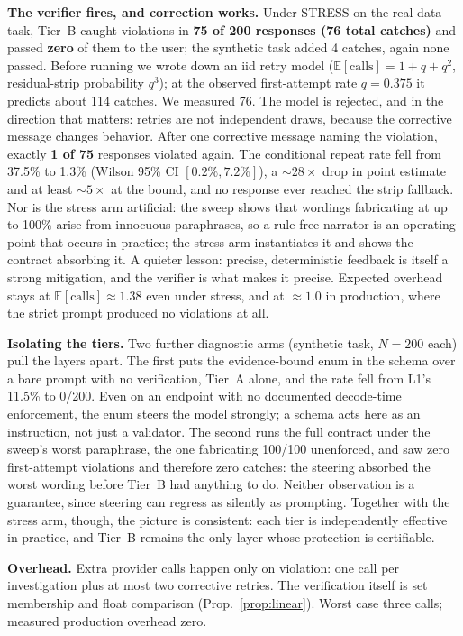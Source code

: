 \documentclass[conference]{IEEEtran}
\begin{document}
\textbf{The verifier fires, and correction works.} Under STRESS on the real-data task, Tier~B caught violations in \textbf{75 of 200 responses (76 total catches)} and passed \textbf{zero} of them to the user; the synthetic task added 4 catches, again none passed. Before running we wrote down an iid retry model ($\mathbb{E}[\text{calls}] = 1 + q + q^2$, residual-strip probability $q^3$); at the observed first-attempt rate $q = 0.375$ it predicts about 114 catches. We measured 76. The model is rejected, and in the direction that matters: retries are not independent draws, because the corrective message changes behavior. After one corrective message naming the violation, exactly \textbf{1 of 75} responses violated again. The conditional repeat rate fell from 37.5\% to 1.3\% (Wilson 95\% CI $[0.2\%, 7.2\%]$), a ${\sim}28\times$ drop in point estimate and at least ${\sim}5\times$ at the bound, and no response ever reached the strip fallback. Nor is the stress arm artificial: the sweep shows that wordings fabricating at up to 100\% arise from innocuous paraphrases, so a rule-free narrator is an operating point that occurs in practice; the stress arm instantiates it and shows the contract absorbing it. A quieter lesson: precise, deterministic feedback is itself a strong mitigation, and the verifier is what makes it precise. Expected overhead stays at $\mathbb{E}[\text{calls}] \approx 1.38$ even under stress, and at ${\approx}1.0$ in production, where the strict prompt produced no violations at all.

\textbf{Isolating the tiers.} Two further diagnostic arms (synthetic task, $N=200$ each) pull the layers apart. The first puts the evidence-bound enum in the schema over a bare prompt with no verification, Tier~A alone, and the rate fell from L1's 11.5\% to 0/200. Even on an endpoint with no documented decode-time enforcement, the enum steers the model strongly; a schema acts here as an instruction, not just a validator. The second runs the full contract under the sweep's worst paraphrase, the one fabricating 100/100 unenforced, and saw zero first-attempt violations and therefore zero catches: the steering absorbed the worst wording before Tier~B had anything to do. Neither observation is a guarantee, since steering can regress as silently as prompting. Together with the stress arm, though, the picture is consistent: each tier is independently effective in practice, and Tier~B remains the only layer whose protection is certifiable.

\textbf{Overhead.} Extra provider calls happen only on violation: one call per investigation plus at most two corrective retries. The verification itself is set membership and float comparison (Prop.~\ref{prop:linear}). Worst case three calls; measured production overhead zero.
\end{document}
